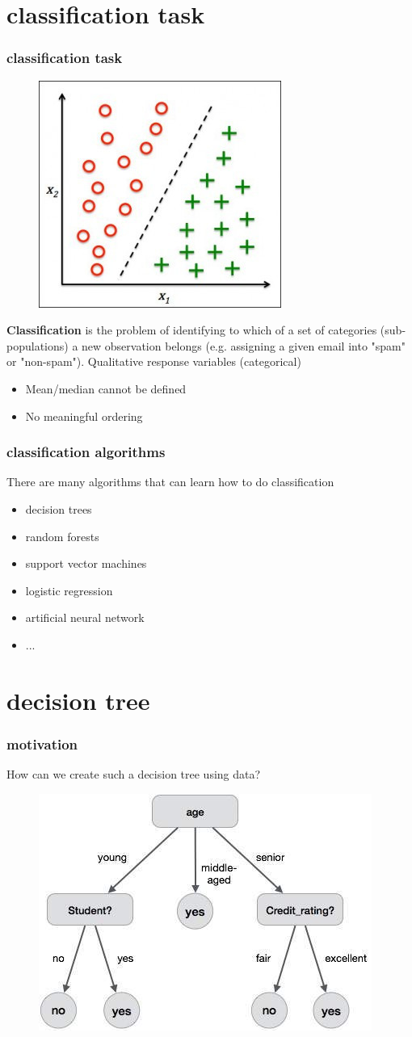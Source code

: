 \documentclass{beamer}
\begin{document}
\section{classification task}
\begin{frame}
\frametitle{classification task}
\begin{figure}
\includegraphics[width = 0.3\linewidth]{figures/04/01_classification/classification_motivation.jpg}
\end{figure}
\textbf{Classification} is the problem of identifying to which of a set of categories (sub-populations) a new observation belongs (e.g. assigning a given email into "spam" or "non-spam").
\newline
Qualitative response variables (categorical)
\begin{itemize}
\item Mean/median cannot be defined
\item No meaningful ordering
\end{itemize}
\end{frame}
\begin{frame}
\frametitle{classification algorithms}
There are many algorithms that can learn how to do classification
\begin{itemize}
\item decision trees
\item random forests
\item support vector machines
\item logistic regression
\item artificial neural network
\item ...
\end{itemize}
\end{frame}



\section{decision tree}
\begin{frame}
\frametitle{motivation}
How can we create such a decision tree using data?
\begin{figure}
\includegraphics[width = 0.6\linewidth]{figures/04/01_classification/decision_tree_rating.jpg}
\end{figure}
\end{frame}
\end{document}
